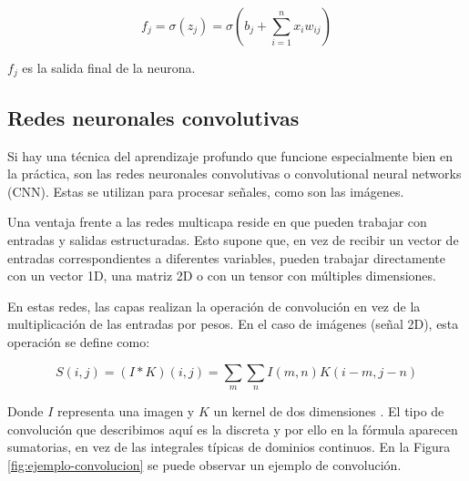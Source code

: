 \begin{equation}
    f_j = \sigma(z_j) = \sigma(b_j + \sum_{i=1}^{n} x_iw_{ij})
\end{equation}

\noindent $f_j$ es la salida final de la neurona. \cite{berzal2018redes}

\subsection{Redes neuronales convolutivas}
Si hay una técnica del aprendizaje profundo que funcione especialmente bien en la práctica, son las redes neuronales convolutivas o convolutional neural networks (CNN). Estas se utilizan para procesar señales, como son las imágenes.

Una ventaja frente a las redes multicapa reside en que pueden trabajar con entradas y salidas estructuradas. Esto supone que, en vez de recibir un vector de entradas correspondientes a diferentes variables, pueden trabajar directamente con un vector 1D, una matriz 2D o con un tensor con múltiples dimensiones. \cite{berzal2018redes} 

En estas redes, las capas realizan la operación de convolución en vez de la multiplicación de las entradas por pesos. En el caso de imágenes (señal 2D), esta operación se define como:

\begin{equation}
    S(i,j) = (I*K)(i,j) = \sum_m \sum_n I(m,n)K(i-m,j-n)
\end{equation}

Donde $I$ representa una imagen y $K$ un kernel de dos dimensiones \cite{Goodfellow-et-al-2016}. El tipo de convolución que describimos aquí es la discreta y por ello en la fórmula aparecen sumatorias, en vez de las integrales típicas de dominios continuos. En la Figura \ref{fig:ejemplo-convolucion} se puede observar un ejemplo de convolución.

